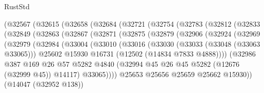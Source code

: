 \begin{lexlean}{RustStd}
\begin{coremodule}
          (@32567
            (@32615
              (@32658
                (@32684
                  (@32721
                    (@32754
                      (@32783
                        (@32812
                          (@32833
                            (@32849
                              (@32863
                                (@32867
                                  (@32871
                                    (@32875
                                      (@32879
                                        (@32906
                                          (@32924
                                            (@32969
                                              (@32979
                                                (@32984
                                                  (@33004
                                                    (@33010
                                                      (@33016
                                                        (@33030
                                                          (@33033 (@33048 (@33063 @33065)))
                                                          @25602
                                                          @15930
                                                          @16731
                                                          (@12502 (@14834 @7833 @4888))))
                                                      (@32986
                                                        @387
                                                        @169
                                                        @26
                                                        @57
                                                        @5282
                                                        @4840
                                                        (@32994
                                                          @45
                                                          @26
                                                          @45
                                                          @5282
                                                          (@12676 (@32999 @45))
                                                          @14117)
                                                        @33065))))
                                                @25653
                                                @25656
                                                @25659
                                                @25662
                                                @15930))
                                            (@14047 (@32952 @138))

\end{coremodule}
\end{lexlean}
